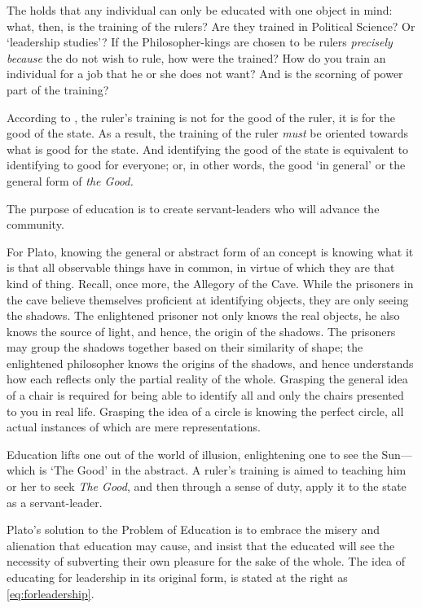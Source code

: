 The  holds that any individual can only be educated with one object in mind: what, then, is the training of the rulers? Are they trained in Political Science? Or `leadership studies'? If the Philosopher-kings are chosen to be rulers \emph{precisely because} the do not wish to rule, how were the trained? How do you train an individual for a job that he or she does not want? And is the scorning of power part of the training?

According to , the ruler's training is not for the good of the ruler, it is for the good of the state. As a result, the training of the ruler \emph{must} be oriented towards what is good for the state. And identifying the good of the state is equivalent to identifying to good for everyone; or, in other words, the good `in general' or the general form of \emph{the Good.}  
\begin{purpose}\label{eq:forleadership}
The purpose of education is to create servant-leaders who will advance the community. \end{purpose}
 

For Plato, knowing the general or abstract form of an concept is knowing what it is that all observable things have in common, in virtue of which they are that kind of thing. Recall, once more, the Allegory of the Cave. While the prisoners in the cave believe themselves proficient at identifying objects, they are only seeing the shadows. The enlightened prisoner not only knows the real objects, he also knows the source of light, and hence, the origin of the shadows. The prisoners may group the shadows together based on their similarity of shape; the enlightened philosopher knows the origins of the shadows, and hence understands how each reflects only the partial reality of the whole. Grasping the general idea of a chair is required for being able to identify all and only the chairs presented to you in real life. Grasping the idea of a circle is knowing the perfect circle, all actual instances of which are mere representations. 

Education lifts one out of the world of illusion, enlightening one to see the Sun---which is `The Good' in the abstract. A ruler's training is aimed to teaching him or her to seek \emph{The Good}, and then through a sense of duty, apply it to the state as a servant-leader.

Plato's solution to the Problem of Education is to embrace the misery and alienation that education may cause, and insist that the educated will see the necessity of subverting their own pleasure for the sake of the whole. The idea of educating for leadership in its original form, is stated at the right as \ref{eq:forleadership}.

